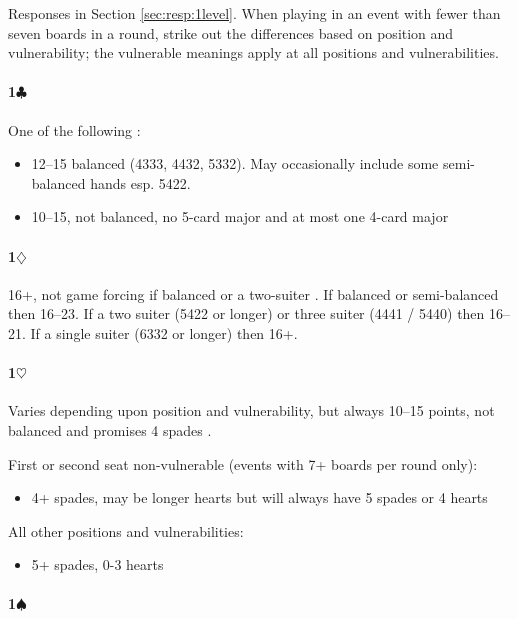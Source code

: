 \documentclass[a4paper,14pt]{extarticle}
\begin{document}
Responses in Section \ref{sec:resp:1level}. When playing in an event with fewer
than seven boards in a round, strike out the differences based on position and
vulnerability; the vulnerable meanings apply at all positions and
vulnerabilities.

\paragraph{1$\clubsuit$}

One of the following :

\begin{itemize}
\item 12--15 balanced (4333, 4432, 5332). May occasionally include some semi-balanced hands esp. 5422.
\item 10--15, not balanced, no 5-card major and at most one 4-card major
\end{itemize}

\paragraph{1$\diamondsuit$}

16+, not game forcing if balanced or a two-suiter . If balanced or semi-balanced then 16--23. If a two suiter (5422 or longer) or three suiter (4441 / 5440) then 16--21. If a single suiter (6332 or longer) then 16+.

\paragraph{1$\heartsuit$}

Varies depending upon position and vulnerability, but always 10--15 points, not
balanced and promises 4 spades .

First or second seat non-vulnerable (events with 7+ boards per round only):
\begin{itemize}
\item 4+ spades, may be longer hearts but will always have 5 spades or 4 hearts
\end{itemize}

All other positions and vulnerabilities:
\begin{itemize}
\item 5+ spades, 0-3 hearts
\end{itemize}

\paragraph{1$\spadesuit$}
\end{document}
